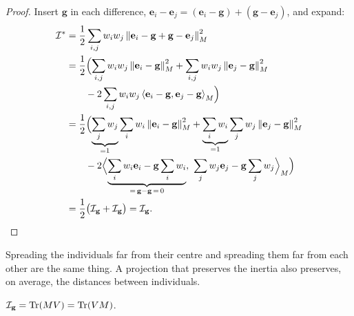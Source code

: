 \begin{notechapter}
\begin{proof}
Insert $\mathbf g$ in each difference, $\mathbf e_i - \mathbf e_j = (\mathbf e_i - \mathbf g) + (\mathbf g - \mathbf e_j)$, and expand:
\begin{align*}
  \mathcal I^* &= \frac12\sum_{i,j}w_iw_j\left\|\mathbf e_i - \mathbf g + \mathbf g - \mathbf e_j\right\|_M^2\\
  &= \frac12\Bigl(\sum_{i,j}w_iw_j\left\|\mathbf e_i - \mathbf g\right\|_M^2 + \sum_{i,j}w_iw_j\left\|\mathbf e_j - \mathbf g\right\|_M^2\\
  &\qquad- 2\sum_{i,j}w_iw_j\left\langle \mathbf e_i - \mathbf g, \mathbf e_j - \mathbf g \right\rangle_M\Bigr)\\
  &= \frac12\Bigl(\underbrace{\sum_jw_j}_{=1}\sum_iw_i\left\|\mathbf e_i - \mathbf g\right\|_M^2
     + \underbrace{\sum_iw_i}_{=1}\sum_jw_j\left\|\mathbf e_j - \mathbf g\right\|_M^2\\
  &\qquad- 2\Bigl\langle\underbrace{\sum_iw_i\mathbf e_i - \mathbf g\sum_iw_i}_{=\,\mathbf g - \mathbf g\,=\,0},\
       \sum_jw_j\mathbf e_j - \mathbf g\sum_jw_j\Bigr\rangle_M\Bigr)\\
  &= \frac12\bigl(\mathcal I_{\mathbf g} + \mathcal I_{\mathbf g}\bigr) = \mathcal I_{\mathbf g}. \qedhere
\end{align*}
\end{proof}

\begin{keyidea}
Spreading the individuals far from their centre and spreading them far from each other
are the same thing. A projection that preserves the inertia also preserves, on average,
the distances between individuals.
\end{keyidea}

\begin{proposition}\label{pca-overview:prop:trace}
$\mathcal I_{\mathbf g} = \operatorname{Tr}(MV) = \operatorname{Tr}(VM)$.
\end{proposition}


\end{notechapter}
